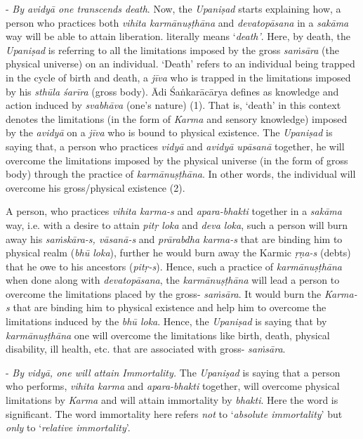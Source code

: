 - \emph{By avidyā one transcends death}. Now, the \emph{Upaniṣad} starts explaining how, a person who practices both \emph{vihita karmānuṣṭhāna} and \emph{devatopāsana} in a \emph{sakāma} way will be able to attain liberation.  literally means `\emph{death'}. Here, by death, the \emph{Upaniṣad} is referring to all the limitations imposed by the gross \emph{saṁsāra} (the physical universe) on an individual. `Death' refers to an individual being trapped in the cycle of birth and death, a \emph{jīva} who is trapped in the limitations imposed by his \emph{sthūla śarīra} (gross body). Ādi Śaṅkarācārya defines  as knowledge and action induced by \emph{svabhāva} (one's nature) (1). That is, `death' in this context denotes the limitations (in the form of \emph{Karma} and sensory knowledge) imposed by the \emph{avidyā} on a \emph{jīva} who is bound to physical existence. The \emph{Upaniṣad} is saying that, a person who practices \emph{vidyā} and \emph{avidyā upāsanā} together, he will overcome the limitations imposed by the physical universe (in the form of gross body) through the practice of \emph{karmānuṣṭhāna}. In other words, the individual will overcome his gross/physical existence (2).

A person, who practices \emph{vihita karma-s} and \emph{apara-bhakti} together in a \emph{sakāma} way, i.e. with a desire to attain \emph{pitṛ loka} and \emph{deva loka}, such a person will burn away his \emph{saṁskāra-s, vāsanā-s} and \emph{prārabdha karma-s} that are binding him to physical realm (\emph{bhū loka}), further he would burn away the Karmic \emph{ṛṇa-s} (debts) that he owe to his ancestors (\emph{pitṛ-s}). Hence, such a practice of \emph{karmānuṣṭhāna} when done along with \emph{devatopāsana}, the \emph{karmānuṣṭhāna} will lead a person to overcome the limitations placed by the gross- \emph{saṁsāra}. It would burn the \emph{Karma-s} that are binding him to physical existence and help him to overcome the limitations induced by the \emph{bhū loka}. Hence, the \emph{Upaniṣad} is saying that by \emph{karmānuṣṭhāna} one will overcome the limitations like birth, death, physical disability, ill health, etc. that are associated with gross- \emph{saṁsāra}.

- \emph{By vidyā, one will attain Immortality.} The \emph{Upaniṣad} is saying that a person who performs, \emph{vihita karma} and \emph{apara-bhakti} together, will overcome physical limitations by \emph{Karma} and will attain immortality by \emph{bhakti}. Here the word  is significant. The word immortality here refers \emph{not} to `\emph{absolute immortality}' but \emph{only} to `\emph{relative immortality}'.


